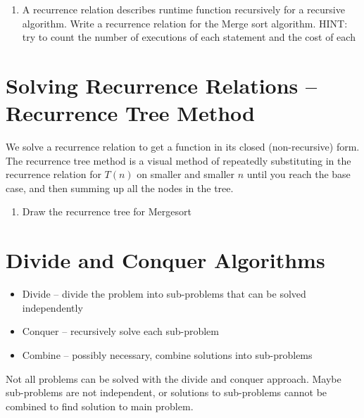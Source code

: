 \documentclass[12pt]{report}
\newcommand{\sectiontype}{\section}
\begin{document}
\begin{enumerate}[label=\arabic*.]
    \item A recurrence relation describes runtime function recursively for a recursive algorithm. Write a recurrence relation for the Merge sort algorithm. HINT: try to count the number of executions of each statement and the cost of each 
\end{enumerate}

\sectiontype{Solving Recurrence Relations -- Recurrence Tree Method}\label{sec:solving-recurrence-relations----recurrence-tree-method}
\noindent We solve a recurrence relation to get a function in its closed (non-recursive) form. The recurrence tree method is a visual method of repeatedly substituting in the recurrence relation for $T(n)$ on smaller and smaller $n$ until you reach the base case, and then summing up all the nodes in the tree.

\begin{enumerate}[label=\arabic*., start=2]
    \item Draw the recurrence tree for Mergesort \\
\end{enumerate}

\sectiontype{Divide and Conquer Algorithms}
\begin{itemize}
    \item Divide -- divide the problem into sub-problems that can be solved independently
    \item Conquer -- recursively solve each sub-problem
    \item Combine -- possibly necessary, combine solutions into sub-problems
\end{itemize}
Not all problems can be solved with the divide and conquer approach. Maybe sub-problems are not independent, or solutions to sub-problems cannot be combined to find solution to main problem.
\end{document}
